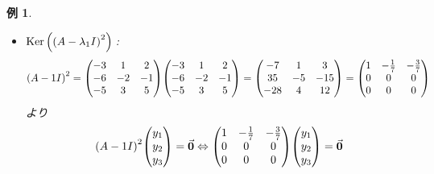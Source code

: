\documentclass[autodetect-engine,dvipdfmx-if-dvi,ja=standard]{bxjsarticle}
\theoremstyle{mystyle1}
\theoremstyle{mystyle2}
\newtheorem{example}{例}
\newcommand{\bbC}{\ensuremath{\mathbb{C}}}
\newcommand{\Ker}{\ensuremath{\text{Ker\,}}}
\begin{document}
\begin{example}
\begin{itemize}
\begin{align*}
            s
            )=\frac{s}{4}\mqty(
            1                                                             \\
            -5                                                            \\
            4
            )\quad\qty(s\text{は任意})
          \end{align*}
          従って
          \[V\qty(\lambda_1)=\left<\mqty(
            1\\
            -5\\
            4
            )\right>\bbC\]
          で
          \[\dim_\bbC V\qty(\lambda_1)=1<3=\qty(\lambda_1\text{の重複度})\]
          となるので$A$は対角化可能でない．
    \item \underline{$\Ker\qty(\qty(A-\lambda_1I)^2)$}\,:
          \[
            \qty(A-1I)^2=\mqty(
            -3&1&2\\
            -6&-2&-1\\
            -5&3&5
            )\mqty(
            -3&1&2\\
            -6&-2&-1\\
            -5&3&5
            )=\mqty(
            -7&1&3\\
            35&-5&-15\\
            -28&4&12
            )=\mqty(
            1&-\frac{1}{7}&-\frac{3}{7}\\
            0&0&0\\
            0&0&0
            )
          \]
          より
          \begin{align*}
            \qty(A-1I)^2\mqty(
            y_1                                                           \\
            y_2                                                           \\
            y_3
            )=\va{0}
              & \Leftrightarrow\mqty(
            1 & -\frac{1}{7}                               & -\frac{3}{7} \\
            0 & 0                                          & 0            \\
            0 & 0                                          & 0
            )\mqty(
            y_1                                                           \\
            y_2                                                           \\
            y_3
            )=\va{0}                                                      \\

\end{align*}
\end{itemize}
\end{example}
\end{document}
